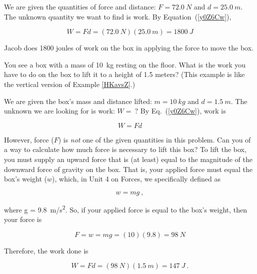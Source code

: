 \documentclass{article}
\numberwithin{equation}{section}
\numberwithin{figure}{section}
\begin{document}
\Solution We are given the quantities of force and distance: $F = \SI{72.0}{N}$ and $d = \SI{25.0}{m}$. The unknown quantity we want to find is work. By Equation~(\ref{y0Z6Cw}), 

\begin{equation*}
    W = F d = \left(\SI{72.0}{N}\right)\left(\SI{25.0}{m}\right) = \SI{1800}{J}
\end{equation*}

Jacob does 1800 joules of work on the box in applying the force to move the box.

\cyanhrule

\begin{example} \label{O9RxyJ}
You see a box with a mass of \SI{10}{kg} resting on the floor. What is the work you have to do on the box to lift it to a height of 1.5 meters? (This example is like the vertical version of Example \ref{HKavsZ}.)
\end{example} 


\Solution We are given the box's mass and distance lifted: $m = \SI{10}{kg}$ and $d = \SI{1.5}{m}$. The unknown we are looking for is work: $W =\ ?$ By Eq.~(\ref{y0Z6Cw}), work is

\begin{equation*}
    W = F d
\end{equation*}

However, force ($F$) is \textit{not} one of the given quantities in this problem. Can you of a way to calculate how much force is necessary to lift this box? To lift the box, you must supply an upward force that is (at least) equal to the magnitude of the downward force of gravity on the box. That is, your applied force must equal the box's weight ($w$), which, in Unit 4 on Forces, we specifically defined as

\begin{equation*}
    w = m g\ ,
\end{equation*}

where  g = \SI{9.8}{m/s^2}. So, if your applied force is equal to the box's weight, then your force is

\begin{equation*}
    F = w = mg = (10)(9.8) = \SI{98}{N}
\end{equation*}

Therefore, the work done is

\begin{equation*}
    W = F d = (\SI{98}{N})(\SI{1.5}{m}) = \SI{147}{J} \ .
\end{equation*}
\end{document}
